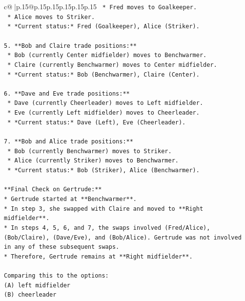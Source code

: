 \documentclass{article}
\begin{document}
{\begin{supertabular}{c@{$\;$}|p{.15\linewidth}@{}p{.15\linewidth}p{.15\linewidth}p{.15\linewidth}p{.15\linewidth}p{.15\linewidth}}
{{{\texttt{    *   Fred moves to Goalkeeper.} \\
\texttt{    *   Alice moves to Striker.} \\
\texttt{    *   *Current status:* Fred (Goalkeeper), Alice (Striker).} \\
\\ 
\texttt{5.  **Bob and Claire trade positions:**} \\
\texttt{    *   Bob (currently Center midfielder) moves to Benchwarmer.} \\
\texttt{    *   Claire (currently Benchwarmer) moves to Center midfielder.} \\
\texttt{    *   *Current status:* Bob (Benchwarmer), Claire (Center).} \\
\\ 
\texttt{6.  **Dave and Eve trade positions:**} \\
\texttt{    *   Dave (currently Cheerleader) moves to Left midfielder.} \\
\texttt{    *   Eve (currently Left midfielder) moves to Cheerleader.} \\
\texttt{    *   *Current status:* Dave (Left), Eve (Cheerleader).} \\
\\ 
\texttt{7.  **Bob and Alice trade positions:**} \\
\texttt{    *   Bob (currently Benchwarmer) moves to Striker.} \\
\texttt{    *   Alice (currently Striker) moves to Benchwarmer.} \\
\texttt{    *   *Current status:* Bob (Striker), Alice (Benchwarmer).} \\
\\ 
\texttt{**Final Check on Gertrude:**} \\
\texttt{*   Gertrude started at **Benchwarmer**.} \\
\texttt{*   In step 3, she swapped with Claire and moved to **Right midfielder**.} \\
\texttt{*   In steps 4, 5, 6, and 7, the swaps involved (Fred/Alice), (Bob/Claire), (Dave/Eve), and (Bob/Alice). Gertrude was not involved in any of these subsequent swaps.} \\
\texttt{*   Therefore, Gertrude remains at **Right midfielder**.} \\
\\ 
\texttt{Comparing this to the options:} \\
\texttt{(A) left midfielder} \\
\texttt{(B) cheerleader} \\
}}}
\end{supertabular}}
\end{document}

